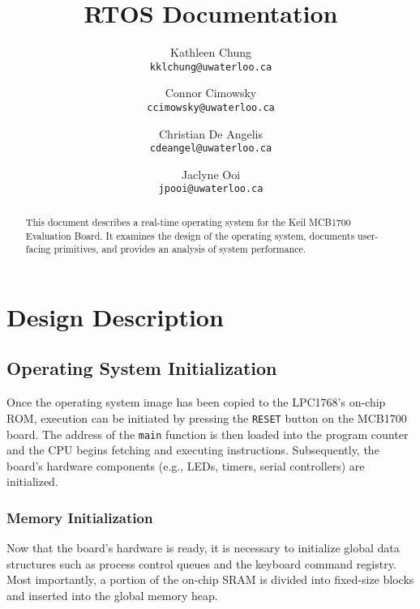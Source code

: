 \documentclass[12pt]{report}
\begin{document}
\title{RTOS Documentation}

\author{
    Kathleen Chung\\
    \texttt{kklchung@uwaterloo.ca}
    \and
    Connor Cimowsky\\
    \texttt{ccimowsky@uwaterloo.ca}
    \and
    Christian De Angelis\\
    \texttt{cdeangel@uwaterloo.ca}
    \and
    Jaclyne Ooi\\
    \texttt{jpooi@uwaterloo.ca}
}

\maketitle

\begin{abstract}

This document describes a real-time operating system for the Keil MCB1700 Evaluation Board. It examines the design of the operating system, documents user-facing primitives, and provides an analysis of system performance.

\end{abstract}

\tableofcontents

\listofalgorithms

\listoffigures

\chapter{Design Description}

\section{Operating System Initialization}

Once the operating system image has been copied to the LPC1768's on-chip ROM, execution can be initiated by pressing the \texttt{RESET} button on the MCB1700 board. The address of the \texttt{main} function is then loaded into the program counter and the CPU begins fetching and executing instructions. Subsequently, the board's hardware components (e.g., LEDs, timers, serial controllers) are initialized.

\subsection{Memory Initialization}

Now that the board's hardware is ready, it is necessary to initialize global data structures such as process control queues and the keyboard command registry. Most importantly, a portion of the on-chip SRAM is divided into fixed-size blocks and inserted into the global memory heap.
\end{document}
